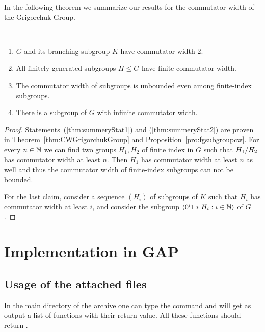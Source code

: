 \documentclass[a4paper,11pt]{amsart}
\begin{document}
In the following theorem we summarize our results for the commutator width of the Grigorchuk Group.
\begin{thm}\ 
 \begin{enumerate}
  \item $G$ and its branching subgroup $K$ have commutator width $2$. \label{thm:summeryStat1}
  \item All finitely generated subgroups $H\leq G$ have finite commutator width.\label{thm:summeryStat2}
  \item \label{thm:summeryStat3} The commutator width of subgroups is unbounded even among finite-index subgroups.
\item \label{thm:summeryStat4} There is a subgroup of $G$ with infinite commutator width.
 \end{enumerate}
\end{thm}
\begin{proof}
 Statements~(\ref{thm:summeryStat1}) and (\ref{thm:summeryStat2}) are proven in Theorem~\ref{thm:CWGrigorchukGroup} and Proposition~\ref{pro:fgsubgroupcw}.
 For every $n\in\mathbb{N}$ we can find two groups $H_1,H_2$ of finite index in $G$ such that ${H_1/H_2}$ has commutator
 width at least $n$. Then $H_1$ has commutator width at least $n$ as well and thus the commutator width of finite-index subgroups can not be bounded.

 For the last claim, consider a sequence $(H_i)$ of subgroups of $K$ such that $H_i$ has commutator width at least $i$, and consider the subgroup $\langle 0^i1*H_i: i\in\mathbb{N}\rangle$ of $G$.
\end{proof}
\section{Implementation in GAP}
\subsection{Usage of the attached files} \label{sec:gap_verify}
In the main directory of the archive one can type the command  and 
will get as output a list of functions with their return value. All these functions should
return \gapinline{true}. 
\end{document}

